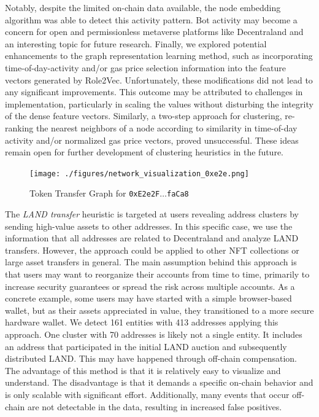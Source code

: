 \documentclass[12pt,a4paper,titlepage,oneside,english]{article}
\begin{document}
Notably, despite the limited on-chain data available, the node embedding algorithm was able to detect this activity pattern. Bot activity may become a concern for open and permissionless metaverse platforms like Decentraland and an interesting topic for future research. \newline
Finally, we explored potential enhancements to the graph representation learning method, such as incorporating time-of-day-activity and/or gas price selection information into the feature vectors generated by Role2Vec. Unfortunately, these modifications did not lead to any significant improvements. This outcome may be attributed to challenges in implementation, particularly in scaling the values without disturbing the integrity of the dense feature vectors.  
Similarly, a two-step approach for clustering, re-ranking the nearest neighbors of a node according to similarity in time-of-day activity and/or normalized gas price vectors, proved unsuccessful. These ideas remain open for further development of clustering heuristics in the future.

\begin{figure}[h!]
	\centering
	\texttt{[image: ./figures/network\_visualization\_0xe2e.png]}
	\caption{Token Transfer Graph for \texttt{0xE2e2F$\dots$faCa8}}
	\label{fig:cluster}
\end{figure}

The \textit{LAND transfer} heuristic is targeted at users revealing address clusters by sending high-value assets to other addresses. In this specific case, we use the information that all addresses are related to Decentraland and analyze LAND transfers. However, the approach could be applied to other NFT collections or large asset transfers in general. \newline
The main assumption behind this approach is that users may want to reorganize their accounts from time to time, primarily to increase security guarantees or spread the risk across multiple accounts. As a concrete example, some users may have started with a simple browser-based wallet, but as their assets appreciated in value, they transitioned to a more secure hardware wallet. We detect 161 entities with 413 addresses applying this approach. One cluster with 70 addresses is likely not a single entity. It includes an address that participated in the initial LAND auction and subsequently distributed LAND. This may have happened through off-chain compensation. The advantage of this method is that it is relatively easy to visualize and understand. The disadvantage is that it demands a specific on-chain behavior and is only scalable with significant effort. Additionally, many events that occur off-chain are not detectable in the data, resulting in increased false positives. 
\end{document}
